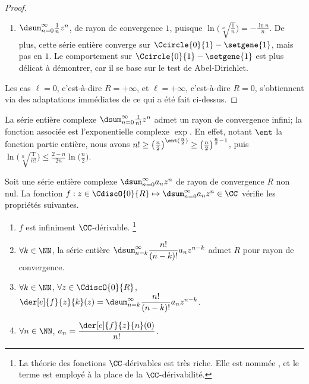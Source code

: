 \begin{proof}
\begin{itemize}
\begin{enumerate}[label=(\alph*)]
	        \item $\dsum_{n=0}^{\infty}  \frac{1}{n} z^n$, 
	        de rayon de convergence $1$,
	        puisque 
	        $ \ln \big( \sqrt[n]{\frac{1}{n}} \big)
	        = -\frac{\ln n}{n}$.
	        De plus,
	        cette série entière converge sur $\Ccircle{0}{1} - \setgene{1}$, mais pas en $1$. 
	        Le comportement sur $\Ccircle{0}{1} - \setgene{1}$ est plus délicat à démontrer, car il se base sur le test de Abel-Dirichlet.
	    \end{enumerate}
    \end{itemize}


    Les cas
    $\ell = 0$, c'est-à-dire $R = +\infty$,
    et
    $\ell = +\infty$, c'est-à-dire $R = 0$,
    s'obtiennent via des adaptations immédiates de ce qui a été fait ci-dessus.
\end{proof}


\begin{example}
	La série entière complexe $\dsum_{n=0}^{\infty} \frac{1}{n!} z^n$ admet un rayon de convergence infini; la fonction associée est l'exponentielle complexe $\exp$.
	En effet,
	notant $\ent$ la fonction partie entière, nous avons
	$n! \geq \big( \frac{n}{2} \big)^{\ent (\frac{n}{2})} \geq \big( \frac{n}{2} \big)^{\frac{n}{2} - 1}$,
	puis
	$ \ln \big( \sqrt[n]{\frac{1}{n!}} \big)
	\leq
	  \frac{2 - n}{2 n} \ln \big( \frac{n}{2} \big)$.
\end{example}




\begin{preli} \label{der-power-serie}
    Soit une série entière complexe $\dsum_{n=0}^{\infty} a_n z^n$ de rayon de convergence $R$ non nul.
    La fonction $f: z \in \CdiscO{0}{R} \mapsto \dsum_{n=0}^{\infty} a_n z^n \in \CC$ vérifie les propriétés suivantes.
    \begin{enumerate}
    	\item $f$ est infiniment $\CC$-dérivable.%
		\footnote{
			La théorie des fonctions $\CC$-dérivables est très riche. Elle est nommée , et le terme  est employé à la place de la $\CC$-dérivabilité.   
		}

    	\item $\forall k \in \NN$,
		la série entière $\dsum_{n = k}^{\infty} \dfrac{n!}{(n-k)!} a_n z^{n - k}$ admet $R$ pour rayon de convergence.

    	\item $\forall k \in \NN$, $\forall z \in \CdiscO{0}{R}$,
		$\der[e]{f}{z}{k}(z) = \dsum_{n = k}^{\infty} \dfrac{n!}{(n-k)!} a_n z^{n - k}$.

    	\item \label{a_n-value}
		$\forall n \in \NN$,  $a_n = \dfrac{\der[e]{f}{z}{n}(0)}{n!}$.
    \end{enumerate}
\end{preli}


